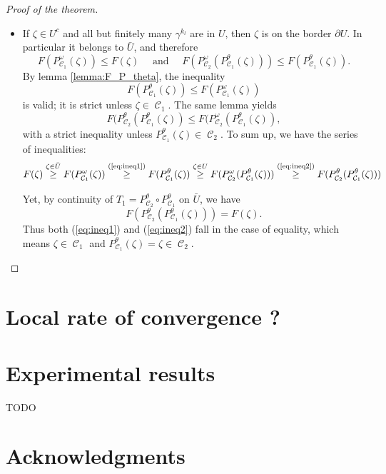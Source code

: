 \documentclass{article} %
\DeclareMathOperator{\Ccal}{\mathcal{C}}
\theoremstyle{plain}
\theoremstyle{definition}
\theoremstyle{remark}
\begin{document}
\begin{proof}[Proof of the theorem]
\begin{itemize}
		 \item If $\zeta \in U^c$ and all but finitely many $\gamma^{k_l}$ are in $U$, then $\zeta$ is on the border $\partial U$. In particular it belongs to $\bar{U}$, and therefore
		 \[
		 F(P^\omega_{\Ccal_1}(\zeta)) \le F(\zeta) \quad
		 \text{ and } \quad
		 F(P^\omega_{\Ccal_2}(P^\theta_{\Ccal_1}(\zeta))) \le F(P^\theta_{\Ccal_1}(\zeta)).
		 \]
		 By lemma \ref{lemma:F_P_theta}, the inequality \begin{equation} \label{eq:ineq1}
		 F(P_{\Ccal_1}^\theta(\zeta)) \le F(P_{\Ccal_1}^\omega(\zeta)) \end{equation}
		 is valid; it is strict unless $\zeta \in \Ccal_1$.
		 The same lemma yields
		 \begin{equation} \label{eq:ineq2}
		 F(P_{\Ccal_2}^\theta(P_{\Ccal_1}^\theta(\zeta)) \le F(P_{\Ccal_2}^\omega(P_{\Ccal_1}^\theta(\zeta)), \end{equation}
		 with a strict inequality unless $P_{\Ccal_1}^\theta(\zeta) \in \Ccal_2$.
		 To sum up, we have the series of inequalities:
		 \[
		 F(\zeta) 
		 \overset{\zeta \in \bar{U}}{\ge}
		 F(P^\omega_{\Ccal_1}(\zeta))
		 \overset{\text{(\ref{eq:ineq1})}}{\ge}
		 F(P^\theta_{\Ccal_1}(\zeta))
		 \overset{\zeta \in U}{\ge}
		 F(P_{\Ccal_2}^\omega(P_{\Ccal_1}^\theta(\zeta)))
		 \overset{\text{(\ref{eq:ineq2})}}{\ge}
		 F(P_{\Ccal_2}^\theta(P_{\Ccal_1}^\theta(\zeta)))
		 \]
		 
		 Yet, by continuity of $T_1 = P_{\Ccal_2}^\theta \circ P_{\Ccal_1}^\theta $ on $\bar{U}$, we have
		 \[
		 F(P_{\Ccal_2}^\theta(P_{\Ccal_1}^\theta(\zeta))) = F(\zeta).
		 \]
		 Thus both (\ref{eq:ineq1}) and (\ref{eq:ineq2}) fall in the case of equality, which means $\zeta \in \Ccal_1$ and $P^\theta_{\Ccal_1}(\zeta) = \zeta \in \Ccal_2$.
	\end{itemize}
\end{proof}


\section{Local rate of convergence ?}

\section{Experimental results}
{\color{red} TODO}


\section*{Acknowledgments}





\end{document}
